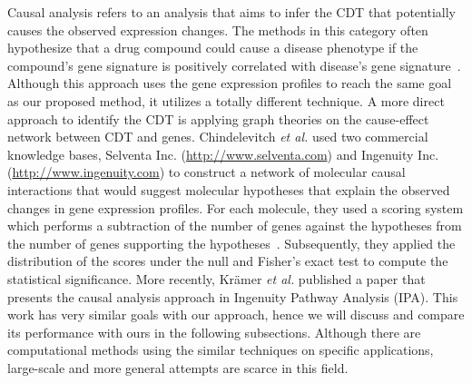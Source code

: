 \documentclass[Minh_PhD_thesis.tex]{subfiles}
\begin{document}
Causal analysis refers to an analysis that aims to infer the CDT that potentially causes the observed expression changes. The methods in this category often hypothesize that a drug compound could cause a disease phenotype if the compound's gene signature is positively correlated with disease's gene signature~\cite{huang2013inferring}. Although this approach uses the gene expression profiles to reach the same goal as our proposed method, it utilizes a totally different technique. A more direct approach to identify the CDT is applying graph theories on the cause-effect network between CDT and genes. Chindelevitch \textit{et al.} used two commercial knowledge bases, Selventa Inc. (\href{http://www.selventa.com}{http://www.selventa.com}) and Ingenuity Inc. (\href{http://www.ingenuity.com}{http://www.ingenuity.com}) to construct a network of molecular causal interactions  that would suggest molecular hypotheses that explain the observed changes in gene expression profiles. For each molecule, they used a scoring system which performs a subtraction of  the number of genes against the hypotheses from the number of genes supporting the hypotheses~\cite{chindelevitch2012causal}. Subsequently, they applied the distribution of the scores under the null and Fisher's exact test to compute the statistical significance. More recently, Kr{\"a}mer \textit{et al.} published a paper that presents the causal analysis approach in Ingenuity Pathway Analysis (IPA). This work has very similar goals with our approach, hence we will discuss and compare its performance with ours in the following subsections. Although there are computational methods using the similar techniques on specific applications, %
large-scale and more general attempts are scarce in this field.
\end{document}
